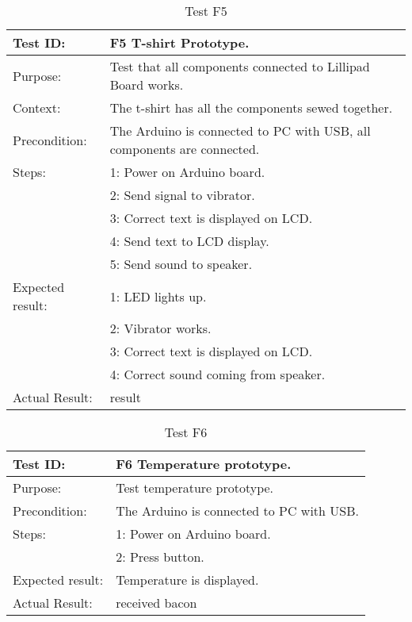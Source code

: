 \begin{table}[h!]
\begin{tabular}{|l|p{10cm}|}
\hline Test ID: & F5 T-shirt Prototype. \\ 
\hline Purpose: & Test that all components connected to Lillipad Board works. \\ 
\hline Context: & The t-shirt has all the components sewed together. \\ 
\hline Precondition: & The Arduino is connected to PC with USB, all components are connected. \\ 
\hline
Steps: & 1: Power on Arduino board.\\ 
  & 2: Send signal to vibrator. \\ 
  & 3: Correct text is displayed on LCD. \\ 
  & 4: Send text to LCD display. \\
  & 5: Send sound to speaker.\\
  \hline
  Expected result: & 1: LED lights up.\\ 
    & 2: Vibrator works. \\ 
    & 3: Correct text is displayed on LCD. \\ 
    & 4: Correct sound coming from speaker. \\
  \hline
Actual Result: &  result \\
  \hline
\end{tabular}
\caption{Test F5}
\label{tbl:f5test}
\end{table}

\begin{table}[h!]
\begin{tabular}{|l|p{10cm}|}
\hline Test ID: & F6 Temperature prototype. \\ 
\hline Purpose: & Test temperature prototype. \\ 
\hline Precondition: & The Arduino is connected to PC with USB. \\ 
\hline
Steps: & 1: Power on Arduino board.\\ 
  & 2: Press button. \\ 
  \hline
  Expected result: & Temperature is displayed.\\ 
  \hline
Actual Result: & received bacon \\
  \hline
\end{tabular}
\caption{Test F6}
\label{tbl:f6test}
\end{table}


